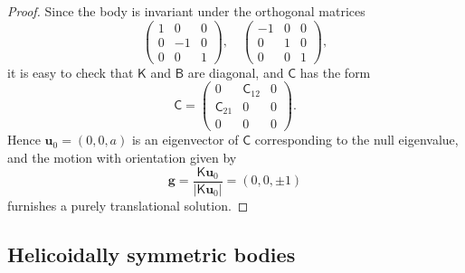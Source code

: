 \documentclass[final]{amsart}
\theoremstyle{definition}
\theoremstyle{definition}
\theoremstyle{remark}
\begin{document}
\begin{proof}
Since the body is invariant under the orthogonal matrices
\[
\begin{pmatrix}
1 & 0 & 0\\
0 & -1 & 0\\
0 & 0 & 1
\end{pmatrix},\quad
\begin{pmatrix}
-1 & 0 & 0\\
0 & 1 & 0\\
0 & 0 & 1
\end{pmatrix},
\]
it is easy to check that ${\mathsf K}$ and ${\mathsf B}$ are diagonal, and ${\mathsf C}$
has the form
\[
{\mathsf C}=
\begin{pmatrix}
0 & {\mathsf C}_{12} & 0\\
{\mathsf C}_{21} & 0 & 0\\
0 & 0 & 0
\end{pmatrix}.
\]
Hence ${\boldsymbol u}_0=(0,0,a)$ is an eigenvector of ${\mathsf C}$ corresponding to the null
eigenvalue, and the motion with orientation given by 
\[
{\boldsymbol g}=\frac{{\mathsf K}{\boldsymbol u}_0}{|{\mathsf K}{\boldsymbol u}_0|}=(0,0,\pm 1)
\]
furnishes a purely translational solution.
\end{proof}

\subsection{Helicoidally symmetric bodies}
\end{document}
